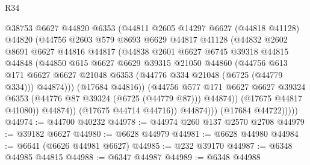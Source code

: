 \begin{lexlean}{R34}
\begin{coremodule}
                        @38753
                        @6627
                        @44820
                        @6353
                        (@44811
                          @2605
                          @14297
                          @6627
                          (@44818 @41128)
                          @44820
                          (@44756
                            @2603
                            @579
                            @8693
                            @6629
                            @44817
                            @41128
                            (@44832
                              @2602
                              @8691
                              @6627
                              @44816
                              @44817
                              (@44838
                                @2601
                                @6627
                                @6745
                                @39318
                                @44815
                                @44848
                                (@44850
                                  @615
                                  @6627
                                  @6629
                                  @39315
                                  @21050
                                  @44860
                                  (@44756
                                    @613
                                    @171
                                    @6627
                                    @6627
                                    @21048
                                    @6353
                                    (@44776 @334 @21048 (@6725 (@44779 @334)))
                                    @44874)))
                              (@17684 @44816))
                            (@44756
                              @577
                              @171
                              @6627
                              @6627
                              @39324
                              @6353
                              (@44776 @87 @39324 (@6725 (@44779 @87)))
                              @44874))
                          (@17675 @44817 @41080))
                        @44874))
                    (@17675 @44714 @44716))
                  @44874)))
            (@17684 @44722)))))
@44974 := @44700 @40232
@44978 := @44974 @260 @137 @2570 @2708
@44979 := @39182 @6627
@44980 := @6628 @44979
@44981 := @6628 @44980
@44984 := @6641 (@6626 @44981 @6627)
@44985 := @232 @39170
@44987 := @6348 @44985 @44815
@44988 := @6347 @44987
@44989 := @6348 @44988

\end{coremodule}
\end{lexlean}
